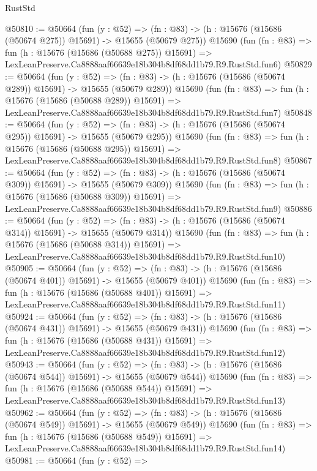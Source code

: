 \begin{lexlean}{RustStd}
\begin{coremodule}
@50810 := @50664
    (fun (y : @52) =>
    (fn : @83) -> (h : @15676 (@15686 (@50674 @275)) @15691) -> @15655 (@50679 @275))
    @15690
    (fun (fn : @83) =>
    fun (h : @15676 (@15686 (@50688 @275)) @15691) =>
    LexLeanPreserve.Ca8888aaf66639e18b304b8df68dd1b79.R9.RustStd.fun6)
@50829 := @50664
    (fun (y : @52) =>
    (fn : @83) -> (h : @15676 (@15686 (@50674 @289)) @15691) -> @15655 (@50679 @289))
    @15690
    (fun (fn : @83) =>
    fun (h : @15676 (@15686 (@50688 @289)) @15691) =>
    LexLeanPreserve.Ca8888aaf66639e18b304b8df68dd1b79.R9.RustStd.fun7)
@50848 := @50664
    (fun (y : @52) =>
    (fn : @83) -> (h : @15676 (@15686 (@50674 @295)) @15691) -> @15655 (@50679 @295))
    @15690
    (fun (fn : @83) =>
    fun (h : @15676 (@15686 (@50688 @295)) @15691) =>
    LexLeanPreserve.Ca8888aaf66639e18b304b8df68dd1b79.R9.RustStd.fun8)
@50867 := @50664
    (fun (y : @52) =>
    (fn : @83) -> (h : @15676 (@15686 (@50674 @309)) @15691) -> @15655 (@50679 @309))
    @15690
    (fun (fn : @83) =>
    fun (h : @15676 (@15686 (@50688 @309)) @15691) =>
    LexLeanPreserve.Ca8888aaf66639e18b304b8df68dd1b79.R9.RustStd.fun9)
@50886 := @50664
    (fun (y : @52) =>
    (fn : @83) -> (h : @15676 (@15686 (@50674 @314)) @15691) -> @15655 (@50679 @314))
    @15690
    (fun (fn : @83) =>
    fun (h : @15676 (@15686 (@50688 @314)) @15691) =>
    LexLeanPreserve.Ca8888aaf66639e18b304b8df68dd1b79.R9.RustStd.fun10)
@50905 := @50664
    (fun (y : @52) =>
    (fn : @83) -> (h : @15676 (@15686 (@50674 @401)) @15691) -> @15655 (@50679 @401))
    @15690
    (fun (fn : @83) =>
    fun (h : @15676 (@15686 (@50688 @401)) @15691) =>
    LexLeanPreserve.Ca8888aaf66639e18b304b8df68dd1b79.R9.RustStd.fun11)
@50924 := @50664
    (fun (y : @52) =>
    (fn : @83) -> (h : @15676 (@15686 (@50674 @431)) @15691) -> @15655 (@50679 @431))
    @15690
    (fun (fn : @83) =>
    fun (h : @15676 (@15686 (@50688 @431)) @15691) =>
    LexLeanPreserve.Ca8888aaf66639e18b304b8df68dd1b79.R9.RustStd.fun12)
@50943 := @50664
    (fun (y : @52) =>
    (fn : @83) -> (h : @15676 (@15686 (@50674 @544)) @15691) -> @15655 (@50679 @544))
    @15690
    (fun (fn : @83) =>
    fun (h : @15676 (@15686 (@50688 @544)) @15691) =>
    LexLeanPreserve.Ca8888aaf66639e18b304b8df68dd1b79.R9.RustStd.fun13)
@50962 := @50664
    (fun (y : @52) =>
    (fn : @83) -> (h : @15676 (@15686 (@50674 @549)) @15691) -> @15655 (@50679 @549))
    @15690
    (fun (fn : @83) =>
    fun (h : @15676 (@15686 (@50688 @549)) @15691) =>
    LexLeanPreserve.Ca8888aaf66639e18b304b8df68dd1b79.R9.RustStd.fun14)
@50981 := @50664
    (fun (y : @52) =>

\end{coremodule}
\end{lexlean}
